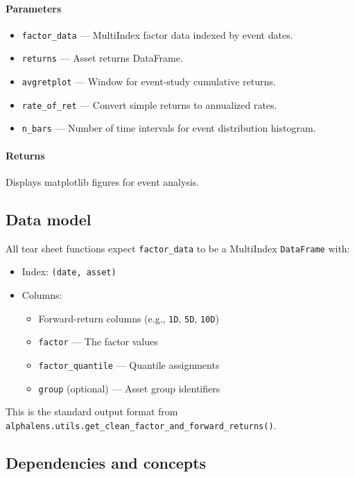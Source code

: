 \documentclass[11pt]{article}
\begin{document}
\paragraph{Parameters}
\begin{itemize}
  \item \texttt{factor\_data} --- MultiIndex factor data indexed by event dates.
  \item \texttt{returns} --- Asset returns DataFrame.
  \item \texttt{avgretplot} --- Window for event-study cumulative returns.
  \item \texttt{rate\_of\_ret} --- Convert simple returns to annualized rates.
  \item \texttt{n\_bars} --- Number of time intervals for event distribution histogram.
\end{itemize}

\paragraph{Returns}
Displays matplotlib figures for event analysis.

\subsection{Data model}

All tear sheet functions expect \texttt{factor\_data} to be a MultiIndex \texttt{DataFrame} with:

\begin{itemize}
  \item Index: \texttt{(date, asset)}
  \item Columns:
  \begin{itemize}
    \item Forward-return columns (e.g., \texttt{1D}, \texttt{5D}, \texttt{10D})
    \item \texttt{factor} --- The factor values
    \item \texttt{factor\_quantile} --- Quantile assignments
    \item \texttt{group} (optional) --- Asset group identifiers
  \end{itemize}
\end{itemize}

This is the standard output format from \texttt{alphalens.utils.get\_clean\_factor\_and\_forward\_returns()}.

\subsection{Dependencies and concepts}
\end{document}

